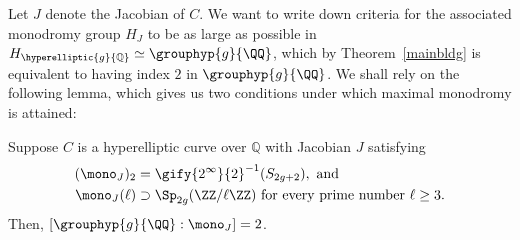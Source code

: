 Let $J$ denote the Jacobian of $C$. We want to write down criteria for the associated monodromy group $H_J$ to be as large as possible in $H_{\hyperelliptic{g}{\mathbb Q}} \simeq \grouphyp{g}{\QQ}$, which by Theorem~\ref{mainbldg} is equivalent to having index $2$ in $\grouphyp{g}{\QQ}$.
We shall rely on the following lemma, which gives us two conditions under which maximal monodromy is attained:
\begin{lemma}
	\label{lemma:reduction-from-adelic-to-mod-l}
	Suppose $C$ is a hyperelliptic curve over $\mathbb Q$ with Jacobian $J$ satisfying
	\begin{align}\label{thethingIwanttocheck}
(\mono_J)_2 &= \gify{2^\infty}{2}^{-1}(S_{2g+2}), \text{ and} \\ 
\label{asillysequel}
\mono_J(\ell) &\supset \Sp_{2g}(\ZZ / \ell \ZZ) \text{ for every prime number } \ell \geq 3.
\end{align}
Then, $[\grouphyp{g}{\QQ} : \mono_J] = 2$.
\end{lemma}

